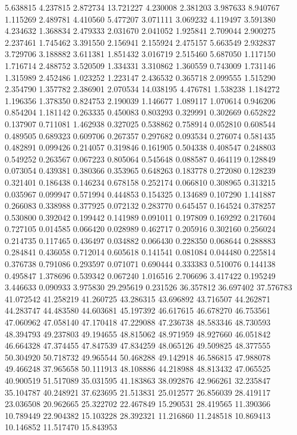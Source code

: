 5.638815
4.237815
2.872734
13.721227
4.230008
2.381203
3.987633
8.940767
1.115269
2.489781
4.410560
5.477207
3.071111
3.069232
4.119497
3.591380
4.234632
1.368834
2.479333
2.031670
2.041052
1.925841
2.709044
2.900275
2.237461
1.745462
3.391550
2.156941
2.155924
2.475157
5.663549
2.932837
3.729706
3.188882
3.611381
1.851432
3.016719
2.515460
5.687050
1.117150
1.716714
2.488752
3.520509
1.334331
3.310862
1.360559
0.743009
1.731146
1.315989
2.452486
1.023252
1.223147
2.436532
0.365718
2.099555
1.515290
2.354790
1.357782
2.386901
2.070534
14.038195
4.476781
1.538238
1.184272
1.196356
1.378350
0.824753
2.190039
1.146677
1.089117
1.070614
0.946206
0.854204
1.181142
0.263335
0.450083
0.803293
0.329991
0.302669
0.652822
0.137907
0.711081
1.462938
0.327025
0.538862
0.758914
0.052810
0.608544
0.489505
0.689323
0.609706
0.267357
0.297682
0.093534
0.276074
0.581435
0.482891
0.099426
0.214057
0.319846
0.161905
0.504338
0.408547
0.248803
0.549252
0.263567
0.067223
0.805064
0.545648
0.088587
0.464119
0.128849
0.073054
0.439381
0.380366
0.353965
0.648263
0.183778
0.272080
0.128239
0.321401
0.186438
0.146234
0.678158
0.252174
0.066810
0.308965
0.313215
0.035967
0.099947
0.571994
0.444853
0.154325
0.134689
0.107290
1.141887
0.266083
0.338988
0.377925
0.072132
0.283770
0.645457
0.164524
0.378257
0.530800
0.392042
0.199442
0.141989
0.091011
0.197809
0.169292
0.217604
0.727105
0.014585
0.066420
0.028989
0.462717
0.205916
0.302160
0.256024
0.214735
0.117465
0.436497
0.034882
0.066430
0.228350
0.068644
0.288883
0.284841
0.436058
0.712014
0.605618
0.141541
0.081084
0.044480
0.225814
0.376738
0.791086
0.293597
0.071071
0.690444
0.333383
0.510076
0.144138
0.495847
1.378696
0.539342
0.067240
1.016516
2.706696
3.417422
0.195249
3.446633
0.090933
3.975830
29.295619
0.231526
36.357812
36.697402
37.576783
41.072542
41.258219
41.260725
43.286315
43.696892
43.716507
44.262871
44.283747
44.483580
44.603681
45.197392
46.617615
46.678270
46.753561
47.060962
47.058140
47.170418
47.229088
47.236738
48.583346
48.730593
48.394793
49.237803
49.194655
48.815062
48.971959
48.927660
46.051842
46.664328
47.374455
47.847539
47.834259
48.065126
49.509825
48.377555
50.304920
50.718732
49.965544
50.468288
49.142918
46.586815
47.988078
49.466248
37.965658
50.111913
48.108886
44.218988
48.813432
47.065525
40.900519
51.517089
35.031595
41.183863
38.092876
42.966261
32.235847
35.104787
40.248921
37.623695
21.513831
25.012577
26.856039
28.419117
23.036508
20.962665
25.322702
22.467849
15.290531
28.419565
11.390366
10.789449
22.904382
15.103228
28.392321
11.216860
11.248518
10.869413
10.146852
11.517470
15.843953
